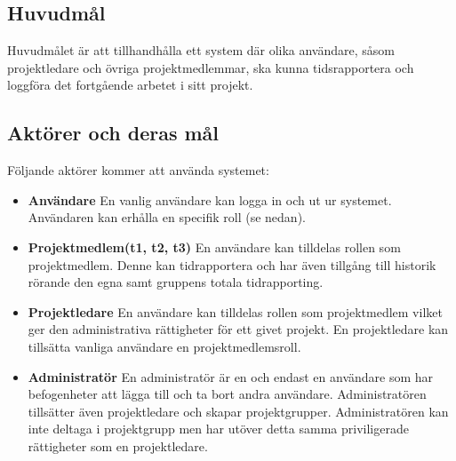 \documentclass[a4paper]{article}
\begin{document}
\subsection{Huvudmål}
Huvudmålet är att tillhandhålla ett system där olika användare, såsom projektledare och övriga projektmedlemmar, ska kunna tidsrapportera och loggföra det fortgående arbetet i sitt projekt. 

\subsection{Aktörer och deras mål}
Följande aktörer kommer att använda systemet:
\begin{itemize}
\item [] \textbf{Användare} En vanlig användare kan logga in och ut ur systemet.  Användaren kan erhålla en specifik roll (se nedan).
\item [] \textbf{Projektmedlem(t1, t2, t3) }En användare kan tilldelas rollen som projektmedlem. Denne kan tidrapportera och har även tillgång till historik rörande den egna samt gruppens totala tidrapporting.
\item [] \textbf{Projektledare} En användare kan tilldelas rollen som projektmedlem vilket ger den administrativa rättigheter för ett givet projekt. En projektledare kan tillsätta vanliga användare en projektmedlemsroll.
\item [] \textbf{Administratör} En administratör är en och endast en användare som har befogenheter att lägga till och ta bort andra användare. Administratören tillsätter även projektledare och skapar projektgrupper. Administratören kan inte deltaga i projektgrupp men har utöver detta samma priviligerade rättigheter som en projektledare.
\end{itemize}
\end{document}
